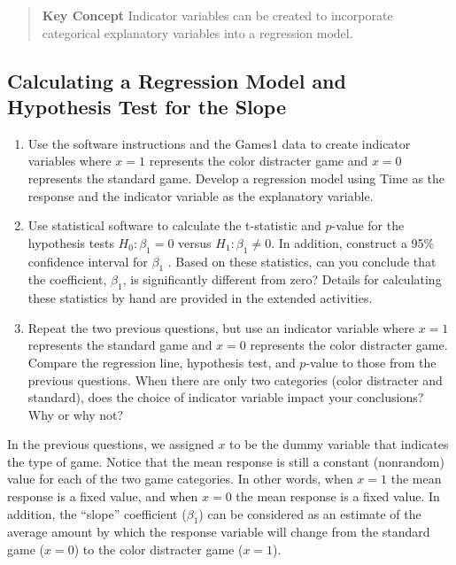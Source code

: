 \documentclass[
]{report}
\begin{document}
\begin{quote}
\textbf{Key Concept}
Indicator variables can be created to incorporate categorical explanatory variables into a regression model.
\end{quote}

\hypertarget{calculating-a-regression-model-and-hypothesis-test-for-the-slope}{%
\subsection*{Calculating a Regression Model and Hypothesis Test for the Slope}\label{calculating-a-regression-model-and-hypothesis-test-for-the-slope}}

\begin{enumerate}
\def\labelenumi{\arabic{enumi}.}
\setcounter{enumi}{10}
\item
  Use the software instructions and the Games1 data to create indicator variables where \(x = 1\) represents the color distracter game and \(x = 0\) represents the standard game. Develop a regression model using Time as the response and the indicator variable as the explanatory variable.
\item
  Use statistical software to calculate the t-statistic and \(p\)-value for the hypothesis tests \(H_0 : \beta_1 = 0\) versus \(H_1 : \beta_1 \ne 0\). In addition, construct a 95\% confidence interval for \(\beta_1\) . Based on these statistics, can you conclude that the coefficient, \(\beta_1\), is significantly different from zero? Details for calculating these statistics by hand are provided in the extended activities.
\item
  Repeat the two previous questions, but use an indicator variable where \(x = 1\) represents the standard game and \(x = 0\) represents the color distracter game. Compare the regression line, hypothesis test, and \(p\)-value to those from the previous questions. When there are only two categories (color distracter and standard), does the choice of indicator variable impact your conclusions? Why or why not?
\end{enumerate}

In the previous questions, we assigned \(x\) to be the dummy variable that indicates the type of game. Notice that the mean response is still a constant (nonrandom) value for each of the two game categories. In other
words, when \(x = 1\) the mean response is a fixed value, and when \(x = 0\) the mean response is a fixed value. In addition, the ``slope'' coefficient (\(\beta_1\)) can be considered as an estimate of the average amount by which the response variable will change from the standard game (\(x = 0\)) to the color distracter game (\(x = 1\)).
\end{document}
